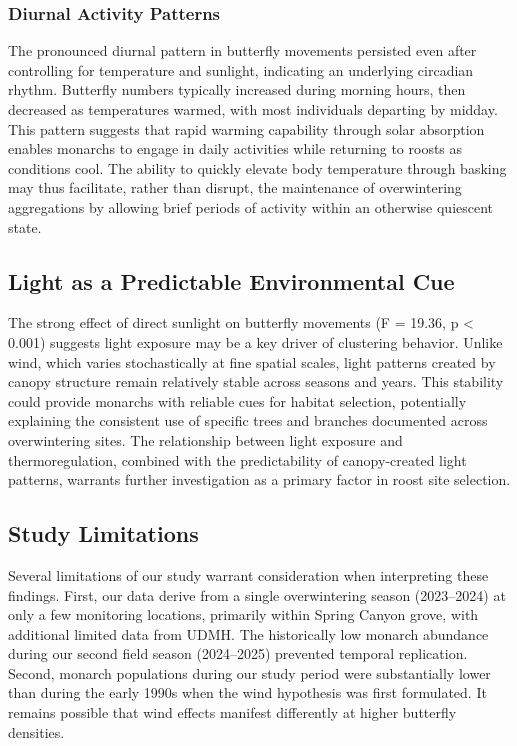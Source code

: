 \subsubsection{Diurnal Activity Patterns}

The pronounced diurnal pattern in butterfly movements persisted even after controlling for temperature and sunlight, indicating an underlying circadian rhythm. Butterfly numbers typically increased during morning hours, then decreased as temperatures warmed, with most individuals departing by midday. This pattern suggests that rapid warming capability through solar absorption enables monarchs to engage in daily activities while returning to roosts as conditions cool. The ability to quickly elevate body temperature through basking may thus facilitate, rather than disrupt, the maintenance of overwintering aggregations by allowing brief periods of activity within an otherwise quiescent state.
\subsection{Light as a Predictable Environmental Cue}

The strong effect of direct sunlight on butterfly movements (F = 19.36, p < 0.001) suggests light exposure may be a key driver of clustering behavior. Unlike wind, which varies stochastically at fine spatial scales, light patterns created by canopy structure remain relatively stable across seasons and years. This stability could provide monarchs with reliable cues for habitat selection, potentially explaining the consistent use of specific trees and branches documented across overwintering sites. The relationship between light exposure and thermoregulation, combined with the predictability of canopy-created light patterns, warrants further investigation as a primary factor in roost site selection.

\subsection{Study Limitations}

Several limitations of our study warrant consideration when interpreting these findings. First, our data derive from a single overwintering season (2023--2024) at only a few monitoring locations, primarily within Spring Canyon grove, with additional limited data from UDMH. The historically low monarch abundance during our second field season (2024--2025) prevented temporal replication. Second, monarch populations during our study period were substantially lower than during the early 1990s when the wind hypothesis was first formulated. It remains possible that wind effects manifest differently at higher butterfly densities.

